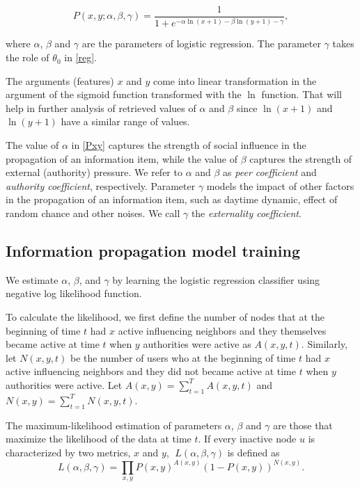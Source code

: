 \documentclass[times, utf8, zavrsni]{fer}
\begin{document}
\begin{equation}
\label{Pxy}
 P(x, y; \alpha, \beta, \gamma) = \frac{1}{1 + e ^ {-\alpha \ln(x + 1) - \beta \ln(y + 1) - \gamma}},	
\end{equation}

where $\alpha$, $\beta$ and $\gamma$ are the parameters of logistic regression. The parameter $\gamma$ takes the role of $\theta_0$ in \eqref{reg}.

The arguments (features) $x$ and $y$ come into linear transformation in the argument of the sigmoid function transformed with the $\ln$ function.  That will help in further analysis of retrieved  values of $\alpha$ and $\beta$ since $\ln(x+1)$ and $\ln(y + 1)$ have a similar range of values.  

The value of $\alpha$ in \eqref{Pxy} captures the strength of social influence in the propagation of an information item, while the value of $\beta$ captures the strength of external (authority) pressure. We refer to $\alpha$ and $\beta$ as \emph{peer coefficient} and \emph{authority coefficient}, respectively. Parameter $\gamma$ models the impact of other factors in the propagation of an information item, such as daytime dynamic, effect of random chance and other noises. We call $\gamma$ the \emph{externality coefficient}. 

\subsection{Information propagation model training}
We estimate $\alpha$, $\beta$, and $\gamma$ by learning the logistic regression classifier using negative log likelihood function. 

To calculate the likelihood, we first define the number of nodes that at the beginning of time $t$ had $x$ active influencing neighbors and they themselves became active at time $t$ when $y$ authorities were active as $A(x, y, t)$. Similarly, let $N(x, y, t)$ be the number of users who at the beginning of time $t$ had $x$ active influencing neighbors and they did not became active at time $t$ when $y$ authorities were active. Let $A(x, y) = \sum_{t = 1}^{T}A(x, y, t)$ and $N(x, y) = \sum_{t=1}^{T}N(x, y, t)$. 

The maximum-likelihood estimation of parameters $\alpha$, $\beta$ and $\gamma$ are those that maximize the likelihood of the data at time $t$. If every inactive node $u$ is  characterized by two metrics, $x$ and $y$,  $\; L(\alpha, \beta, \gamma)$ is defined as
\begin{equation}
\label{LF}
 L(\alpha, \beta, \gamma) = \prod_{x, y} P(x, y) ^ {A(x, y)} (1 - P(x, y)) ^ { N(x, y)}.
\end{equation}
\end{document}
